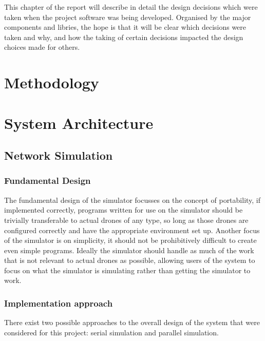 This chapter of the report will describe in detail the design decisions which were taken when the project software was being developed. Organised by the major components and libries, the hope is that it will be clear which decisions were taken and why, and how the taking of certain decisions impacted the design choices made for others.

\section{Methodology}

\section{System Architecture}

\subsection{Network Simulation}

\subsubsection{Fundamental Design}
The fundamental design of the simulator focusses on the concept of portability, if implemented correctly, programs written for use on the simulator should be trivially transferable to actual drones of any type, so long as those drones are configured correctly and have the appropriate environment set up. Another focus of the simulator is on simplicity, it should not be prohibitively difficult to create even simple programs. Ideally the simulator should handle as much of the work that is not relevant to actual drones as possible, allowing users of the system to focus on what the simulator is simulating rather than getting the simulator to work.

\subsubsection{Implementation approach}
There exist two possible approaches to the overall design of the system that were considered for this project: serial simulation and parallel simulation.

